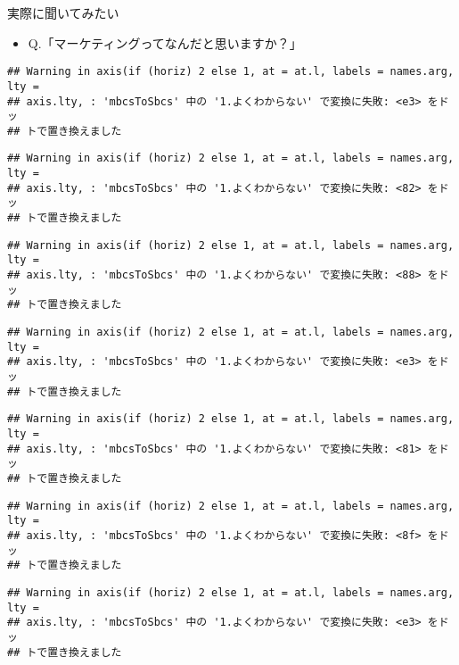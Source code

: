 \documentclass[ignorenonframetext,]{beamer}
\providecommand{\tightlist}{%
  \setlength{\itemsep}{0pt}\setlength{\parskip}{0pt}}
\begin{document}
\begin{frame}[fragile]{実際に聞いてみたい}

\begin{itemize}
\tightlist
\item
  Q.「マーケティングってなんだと思いますか？」
\end{itemize}

\begin{verbatim}
## Warning in axis(if (horiz) 2 else 1, at = at.l, labels = names.arg, lty =
## axis.lty, : 'mbcsToSbcs' 中の '1.よくわからない' で変換に失敗: <e3> をドッ
## トで置き換えました
\end{verbatim}

\begin{verbatim}
## Warning in axis(if (horiz) 2 else 1, at = at.l, labels = names.arg, lty =
## axis.lty, : 'mbcsToSbcs' 中の '1.よくわからない' で変換に失敗: <82> をドッ
## トで置き換えました
\end{verbatim}

\begin{verbatim}
## Warning in axis(if (horiz) 2 else 1, at = at.l, labels = names.arg, lty =
## axis.lty, : 'mbcsToSbcs' 中の '1.よくわからない' で変換に失敗: <88> をドッ
## トで置き換えました
\end{verbatim}

\begin{verbatim}
## Warning in axis(if (horiz) 2 else 1, at = at.l, labels = names.arg, lty =
## axis.lty, : 'mbcsToSbcs' 中の '1.よくわからない' で変換に失敗: <e3> をドッ
## トで置き換えました
\end{verbatim}

\begin{verbatim}
## Warning in axis(if (horiz) 2 else 1, at = at.l, labels = names.arg, lty =
## axis.lty, : 'mbcsToSbcs' 中の '1.よくわからない' で変換に失敗: <81> をドッ
## トで置き換えました
\end{verbatim}

\begin{verbatim}
## Warning in axis(if (horiz) 2 else 1, at = at.l, labels = names.arg, lty =
## axis.lty, : 'mbcsToSbcs' 中の '1.よくわからない' で変換に失敗: <8f> をドッ
## トで置き換えました
\end{verbatim}

\begin{verbatim}
## Warning in axis(if (horiz) 2 else 1, at = at.l, labels = names.arg, lty =
## axis.lty, : 'mbcsToSbcs' 中の '1.よくわからない' で変換に失敗: <e3> をドッ
## トで置き換えました
\end{verbatim}


\end{frame}
\end{document}
